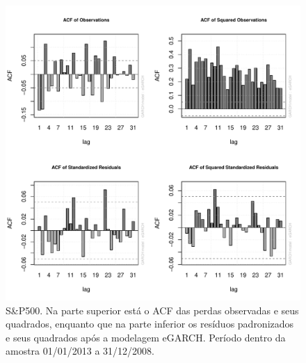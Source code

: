 \documentclass[1p]{elsarticle}
\theoremstyle{definition}
\begin{document}
\begin{figure}[H]
	\centering
	\includegraphics[width=1\linewidth]{figs/artigo-acf-SP500}
	\caption{S\&P500. Na parte superior está o ACF das perdas observadas e seus quadrados, enquanto que na parte inferior os resíduos padronizados e seus quadrados após a modelagem eGARCH. Período dentro da amostra 01/01/2013 a 31/12/2008.}
	\label{fig:artigo-acf-sp500}
\end{figure}
\end{document}
